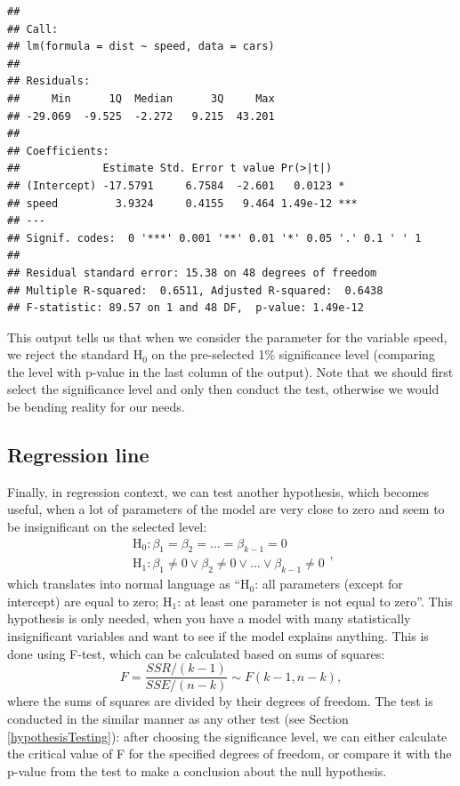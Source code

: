 \documentclass[
]{book}
\theoremstyle{definition}
\theoremstyle{definition}
\theoremstyle{definition}
\theoremstyle{definition}
\theoremstyle{remark}
\begin{document}
\begin{verbatim}
## 
## Call:
## lm(formula = dist ~ speed, data = cars)
## 
## Residuals:
##     Min      1Q  Median      3Q     Max 
## -29.069  -9.525  -2.272   9.215  43.201 
## 
## Coefficients:
##             Estimate Std. Error t value Pr(>|t|)    
## (Intercept) -17.5791     6.7584  -2.601   0.0123 *  
## speed         3.9324     0.4155   9.464 1.49e-12 ***
## ---
## Signif. codes:  0 '***' 0.001 '**' 0.01 '*' 0.05 '.' 0.1 ' ' 1
## 
## Residual standard error: 15.38 on 48 degrees of freedom
## Multiple R-squared:  0.6511, Adjusted R-squared:  0.6438 
## F-statistic: 89.57 on 1 and 48 DF,  p-value: 1.49e-12
\end{verbatim}

This output tells us that when we consider the parameter for the variable speed, we reject the standard H\(_0\) on the pre-selected 1\% significance level (comparing the level with p-value in the last column of the output). Note that we should first select the significance level and only then conduct the test, otherwise we would be bending reality for our needs.

\subsection{Regression line}\label{regression-line}

Finally, in regression context, we can test another hypothesis, which becomes useful, when a lot of parameters of the model are very close to zero and seem to be insignificant on the selected level:
\begin{equation}
    \begin{aligned}
        \mathrm{H}_0: \beta_1 = \beta_2 = \dots = \beta_{k-1} = 0 \\
        \mathrm{H}_1: \beta_1 \neq 0 \vee \beta_2 \neq 0 \vee \dots \vee \beta_{k-1} \neq 0
    \end{aligned} ,
    \label{eq:regressionHypothesis02}
\end{equation}
which translates into normal language as ``H\(_0\): all parameters (except for intercept) are equal to zero; H\(_1\): at least one parameter is not equal to zero''. This hypothesis is only needed, when you have a model with many statistically insignificant variables and want to see if the model explains anything. This is done using F-test, which can be calculated based on sums of squares:
\begin{equation*}
    F = \frac{ SSR / (k-1)}{SSE / (n-k)} \sim F(k-1, n-k) ,
\end{equation*}
where the sums of squares are divided by their degrees of freedom. The test is conducted in the similar manner as any other test (see Section \ref{hypothesisTesting}): after choosing the significance level, we can either calculate the critical value of F for the specified degrees of freedom, or compare it with the p-value from the test to make a conclusion about the null hypothesis.
\end{document}

